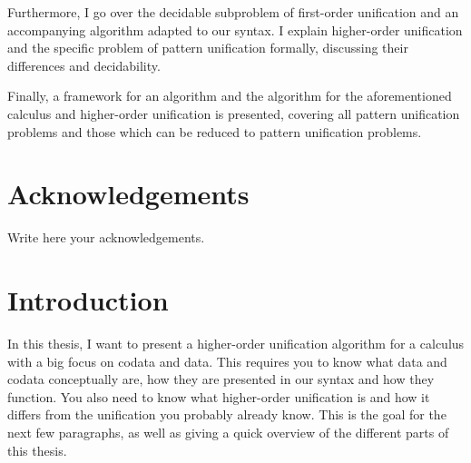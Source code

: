 \documentclass[twoside,12pt,a4paper]{article}
\begin{document}
Furthermore, I go over the decidable subproblem of first-order unification and an accompanying algorithm adapted to our syntax.
I explain higher-order unification and the specific problem of pattern unification formally, 
discussing their differences and decidability.

Finally, a framework for an algorithm and the algorithm for the aforementioned calculus and higher-order unification is presented, 
covering all pattern unification problems and those which can be reduced to pattern unification problems.

\newpage
\section*{Acknowledgements}

Write here your acknowledgements.

\cleardoublepage


\renewcommand{\baselinestretch}{1.3}
\small\normalsize

\tableofcontents

\renewcommand{\baselinestretch}{1}
\small\normalsize

\cleardoublepage


\setcounter{page}{1}

\section{Introduction}

In this thesis, I want to present a higher-order unification algorithm for a calculus with a big focus on codata and data. 
This requires you to know what data and codata conceptually are, how they are presented in our syntax and how they function.
You also need to know what higher-order unification is and how it differs from the unification you probably already know.
This is the goal for the next few paragraphs, as well as giving a quick overview of the different parts of this thesis.
\end{document}
